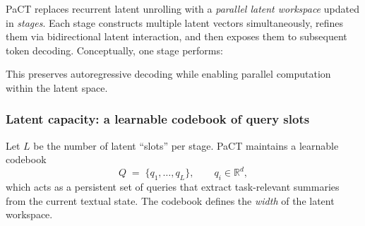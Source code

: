 PaCT replaces recurrent latent unrolling with a \emph{parallel latent workspace} updated in
\emph{stages}. Each stage constructs multiple latent vectors simultaneously, refines them via
bidirectional latent interaction, and then exposes them to subsequent token decoding.
Conceptually, one stage performs:

\begin{center}
\end{center}




This preserves autoregressive decoding while enabling parallel computation within the latent space.



\subsubsection{Latent capacity: a learnable codebook of query slots}
\label{sec:codebook}


Let $L$ be the number of latent ``slots'' per stage. PaCT maintains a learnable codebook
\[
Q \;=\; \{q_1,\dots,q_L\}, \qquad q_i\in\mathbb{R}^d,
\]
which acts as a persistent set of queries that extract task-relevant summaries from the current
textual state. The codebook defines the \emph{width} of the latent workspace. 

